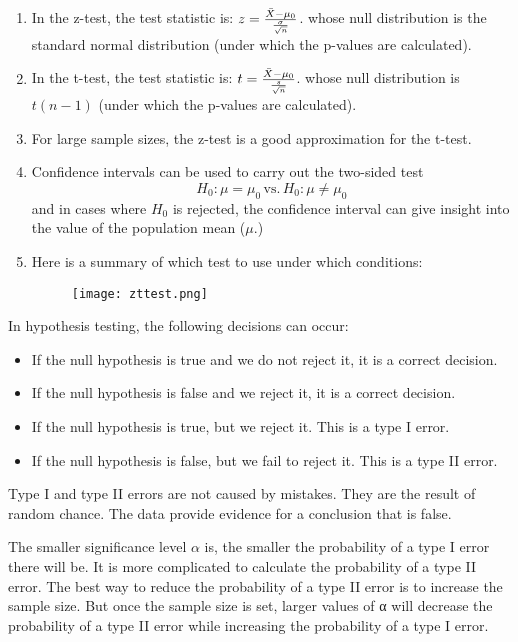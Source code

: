 \documentclass[10pt, a4paper]{article}
\begin{document}
\begin{enumerate}
\item 
 In the z-test, the test statistic is:
 $z=\frac{\bar{X}-\mu_0}{{\sigma \over \sqrt{n}}}$.
 whose null distribution is the standard normal distribution (under which the p-values are calculated).
\item In the t-test, the test statistic is:
    $t=\frac{\bar{X}-\mu_0}{{s \over \sqrt{n}}}$.
whose null distribution is $t(n - 1)$ (under which the p-values are calculated).
\item  For large sample sizes, the z-test is a good approximation for the t-test.
\item Confidence intervals can be used to carry out the two-sided test
\[
    H_0: \mu = \mu_0 \, \text{vs.} \, H_0: \mu \neq \mu_0 
\]
and in cases where $H_0$ is rejected, the confidence interval can give insight into the value of the population mean ($\mu$.)
\item Here is a summary of which test to use under which conditions:
\begin{figure}
    [h!]
    \centering
    \texttt{[image: zttest.png]}
\end{figure}
\end{enumerate}
In hypothesis testing, the following decisions can occur:
\begin{itemize}
\item If the null hypothesis is true and we do not reject it, it is a correct decision.
\item If the null hypothesis is false and we reject it, it is a correct decision.
\item If the null hypothesis is true, but we reject it. This is a type I error.
\item If the null hypothesis is false, but we fail to reject it. This is a type II error.
\end{itemize}
Type I and type II errors are not caused by mistakes. They are the result of random chance. The data provide evidence for a conclusion that is false.\par
The smaller significance level $\alpha$ is, the smaller the probability of a type I error there will be. 
It is more complicated to calculate the probability of a type II error. The best way to reduce the probability of a type II error is to increase the sample size. But once the sample size is set, larger values of α will decrease the probability of a type II error while increasing the probability of a type I error.\\
\end{document}
